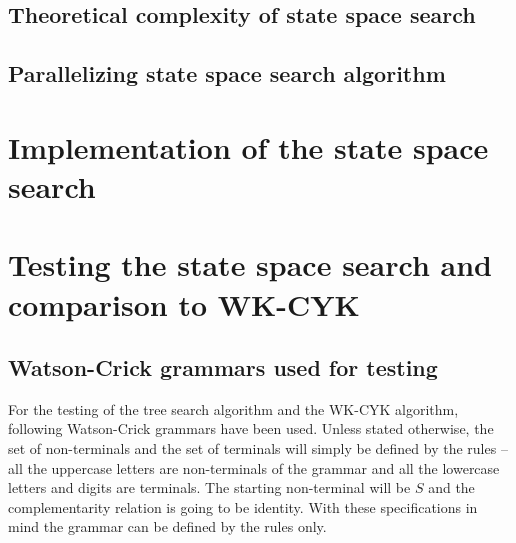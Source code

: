 \section{Theoretical complexity of state space search}

\section{Parallelizing state space search algorithm}

\chapter{Implementation of the state space search} \label{chapter:implementation}

\chapter{Testing the state space search and comparison to WK-CYK}

\section{Watson-Crick grammars used for testing}

For the testing of the tree search algorithm and the WK-CYK algorithm, following Watson-Crick grammars have been used. Unless stated otherwise, the set of non-terminals and the set of terminals will simply be defined by the rules -- all the uppercase letters are non-terminals of the grammar and all the lowercase letters and digits are terminals. The starting non-terminal will be $S$ and the complementarity relation is going to be identity. With these specifications in mind the grammar can be defined by the rules only.

